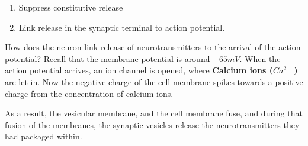 \documentclass[12pt, a4paper]{article}
\begin{document}
\begin{enumerate}
    \item Suppress constitutive release
    \item Link release in the synaptic terminal to action potential.
\end{enumerate}

How does the neuron link release of neurotransmitters to the arrival of the 
action potential? Recall that the membrane potential is around $-65 mV$. When
the action potential arrives, an ion channel is opened, where \textbf{Calcium ions ($Ca^{2+}$)}
are let in. Now the negative charge of the cell membrane spikes towards a positive charge from 
the concentration of calcium ions.

As a result, the vesicular membrane, and the cell membrane fuse, and during that fusion of the membranes, the
synaptic vesicles release the neurotransmitters they had packaged within.\\
\end{document}
